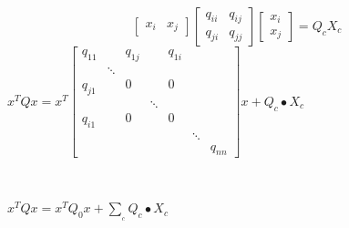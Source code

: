 \documentclass{article}
\begin{document}
\[ \left[\begin{array}{cc}
     x_i & x_j
   \end{array}\right] \left[\begin{array}{cc}
     q_{i i} & q_{i j}\\
     q_{j i} & q_{j j}
   \end{array}\right] \left[\begin{array}{c}
     x_i\\
     x_j
   \end{array}\right] = Q_c X_c \]
$x^T Q x = x^T \left[\begin{array}{ccccccc}
  q_{11} &  & q_{1 j} &  & q_{1 i} &  & \\
  & \ddots &  &  &  &  & \\
  q_{j 1} &  & 0 &  & 0 &  & \\
  &  &  & \ddots &  &  & \\
  q_{i 1} &  & 0 &  & 0 &  & \\
  &  &  &  &  & \ddots & \\
  &  &  &  &  &  & q_{n n}
\end{array}\right] x + Q_c \bullet X_c$

\

$x^T Q x = x^T Q_0 x + \sum_{_c} Q_c \bullet X_c$

\
\end{document}
